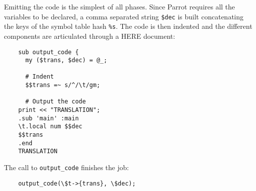 Emitting the code is the simplest of all phases.
Since Parrot requires all the variables to be declared,
a comma separated string \verb|$dec|  is built
concatenating the keys of the symbol table hash \verb|%s|.
The code is then indented and the different components
are articulated through a HERE document:
\begin{verbatim}
    sub output_code {
      my ($trans, $dec) = @_;

      # Indent
      $$trans =~ s/^/\t/gm;

      # Output the code
    print << "TRANSLATION";
    .sub 'main' :main
    \t.local num $$dec
    $$trans
    .end
    TRANSLATION
\end{verbatim}
The call to \verb|output_code| finishes the job:
\begin{verbatim}
    output_code(\$t->{trans}, \$dec);
\end{verbatim}
